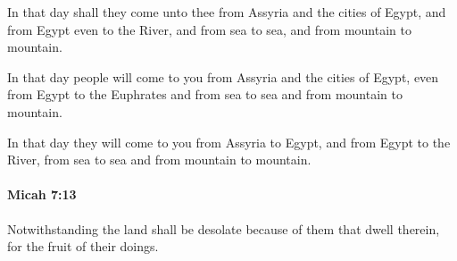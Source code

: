 			\begin{versebox}
					\item[BHS] 
					\item[LXX] 
					\item[ASV] In that day shall they come unto thee from Assyria and the cities of Egypt, and from Egypt even to the River, and from sea to sea, and from mountain to mountain.
					\item[NIV] In that day people will come to you from Assyria and the cities of Egypt, even from Egypt to the Euphrates and from sea to sea and from mountain to mountain.
					\item[NRSV] In that day they will come to you from Assyria to Egypt, and from Egypt to the River, from sea to sea and from mountain to mountain.
			\end{versebox}

		\paragraph{Micah 7:13} %
			\label{MICAH-7-13}

			Notwithstanding the land shall be desolate because of them that dwell therein, for the fruit of their doings.

